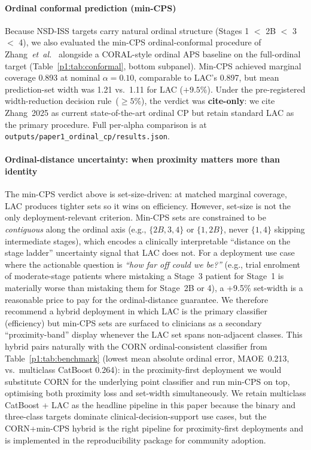 \documentclass[10pt,letterpaper]{article}
\begin{document}
\paragraph*{Ordinal conformal prediction (min-CPS)} Because NSD-ISS targets carry natural ordinal structure (Stages 1 $<$ 2B $<$ 3 $<$ 4), we also evaluated the min-CPS ordinal-conformal procedure of Zhang~\textit{et~al.}~\cite{zhang2025ordinalcp} alongside a CORAL-style ordinal APS baseline on the full-ordinal target (Table~\ref{p1:tab:conformal}, bottom subpanel). Min-CPS achieved marginal coverage 0.893 at nominal $\alpha{=}0.10$, comparable to LAC's 0.897, but mean prediction-set width was 1.21 vs.\ 1.11 for LAC ($+9.5\%$). Under the pre-registered width-reduction decision rule~($\geq 5\%$), the verdict was \textbf{cite-only}: we cite Zhang~2025 as current state-of-the-art ordinal CP but retain standard LAC as the primary procedure. Full per-alpha comparison is at \texttt{outputs/paper1\_ordinal\_cp/results.json}.

\paragraph*{Ordinal-distance uncertainty: when proximity matters more than identity} The min-CPS verdict above is set-size-driven: at matched marginal coverage, LAC produces tighter sets so it wins on efficiency. However, set-size is not the only deployment-relevant criterion. Min-CPS sets are constrained to be \emph{contiguous} along the ordinal axis (e.g., $\{2B, 3, 4\}$ or $\{1, 2B\}$, never $\{1, 4\}$ skipping intermediate stages), which encodes a clinically interpretable ``distance on the stage ladder'' uncertainty signal that LAC does not. For a deployment use case where the actionable question is \emph{``how far off could we be?''} (e.g., trial enrolment of moderate-stage patients where mistaking a Stage~3 patient for Stage~1 is materially worse than mistaking them for Stage~2B or 4), a +9.5\% set-width is a reasonable price to pay for the ordinal-distance guarantee. We therefore recommend a hybrid deployment in which LAC is the primary classifier (efficiency) but min-CPS sets are surfaced to clinicians as a secondary ``proximity-band'' display whenever the LAC set spans non-adjacent classes. This hybrid pairs naturally with the CORN ordinal-consistent classifier from Table~\ref{p1:tab:benchmark} (lowest mean absolute ordinal error, MAOE~0.213, vs.\ multiclass CatBoost 0.264): in the proximity-first deployment we would substitute CORN for the underlying point classifier and run min-CPS on top, optimising both proximity loss and set-width simultaneously. We retain multiclass CatBoost + LAC as the headline pipeline in this paper because the binary and three-class targets dominate clinical-decision-support use cases, but the CORN+min-CPS hybrid is the right pipeline for proximity-first deployments and is implemented in the reproducibility package for community adoption.
\end{document}
